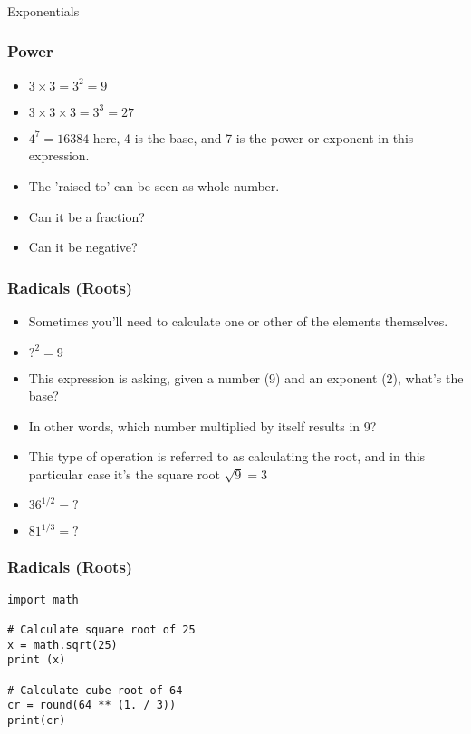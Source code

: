 \begin{frame}[fragile]\frametitle{}
\begin{center}
{\Large Exponentials}
\end{center}
\end{frame}



 \begin{frame}[fragile]\frametitle{Power}
\begin{itemize}
\item $3 \times 3 = 3^2 = 9$
\item $3 \times 3 \times 3 = 3^3 = 27$
\item $4^7 = 16384$ here,  4 is the base, and 7 is the power or exponent in this expression.
\item The 'raised to' can be seen as whole number.
\item Can it be a fraction?
\item Can it be negative?
\end{itemize}
\end{frame}

 \begin{frame}[fragile]\frametitle{Radicals (Roots)}

\begin{itemize}
\item Sometimes you'll need to calculate one or other of the elements themselves.
\item $?^2 = 9$
\item This expression is asking, given a number (9) and an exponent (2), what's the base? 
\item In other words, which number multiplied by itself results in 9? 
\item This type of operation is referred to as calculating the root, and in this particular case it's the square root $\sqrt 9 = 3$ 
\item $36^{1/2} =?$
\item $81^{1/3} =?$
\end{itemize}
\end{frame}

 \begin{frame}[fragile]\frametitle{Radicals (Roots)}
\begin{lstlisting}
import math

# Calculate square root of 25
x = math.sqrt(25)
print (x)

# Calculate cube root of 64
cr = round(64 ** (1. / 3))
print(cr)
\end{lstlisting}
\end{frame}


